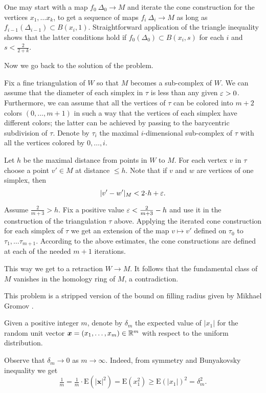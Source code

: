 One may start with a map $f_0\:\Delta_0\to M$ and iterate the cone construction for the vertices $x_1,\dots x_k$,
to get a sequence of maps $f_i\:\Delta_i\to M$
as long as $f_{i-1}(\Delta_{i-1})\subset B(x_i,1)$.
Straightforward application of the triangle inequality 
shows that the latter conditions hold if 
$f_0(\Delta_0)\subset B(x_i,s)$ for each $i$ and $s<\tfrac2{2+k}$.

\medskip

Now we go back to the solution of the problem.

Fix a fine triangulation of $W$ so that $M$ becomes a sub-complex of $W$.
We can assume that the diameter of each simplex in $\tau$ is less than any given
$\varepsilon>0$.
Furthermore, we can assume that all the vertices of $\tau$ can be colored into $m+2$ colors $(0,\dots, m+1)$
in such a way that the vertices of each simplex 
have different colors;
the latter can be achieved by passing to the barycentric subdivision of $\tau$.
Denote by $\tau_i$ the maximal $i$-dimensional sub-complex of $\tau$ 
with all the vertices colored by $0,\dots, i$.

Let $h$ be the maximal distance from points in $W$ to $M$.
For each vertex $v$ in $\tau$ 
choose a point $v'\in M$ at distance $\le h$.
Note that 
if $v$ and $w$ are vertices of one simplex,
then
\[|v'-w'|_M<2\cdot h+\eps.\]

Assume $\tfrac{2}{m+3}>h$.
Fix a positive value $\varepsilon<\tfrac{2}{m+3}-h$ and use it in the construction of the triangulation $\tau$ above.
Applying the iterated cone construction for each simplex of $\tau$
we get an extension of the map $v\mapsto v'$ defined on $\tau_0$ to $\tau_1,\dots\tau_{m+1}$.
According to the above estimates, the cone constructions are defined at each of the needed $m+1$ iterations.

This way we get 
to a retraction $W\to M$.
It follows that the fundamental class of $M$ vanishes in the homology ring of $M$, 
a contradiction. 
\qeds


This problem is a stripped version of the bound on filling radius given by Mikhael Gromov \cite[see][]{gromov-filling}.  

Given a positive integer $m$,
denote by $\delta_m$ 
the expected value of $|x_1|$ for the random unit vector 
$\bm{x}\z=(x_1,\dots,x_m)\z\in\RR^m$ 
with respect to the uniform distribution.

Observe that $\delta_m\to 0$ as $m\to\infty$.
Indeed, from symmetry and Bunyakovsky inequality we get
\[
\tfrac1m=\tfrac1m\cdot\mathrm{E}(|\bm{x}|^2)
=\mathrm{E}(x_1^2)\ge \mathrm{E}(|x_1|)^2=\delta_m^2.
\]


